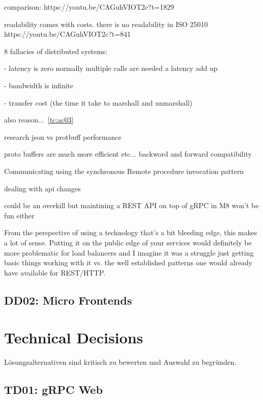 
comparison: https://youtu.be/CAGuhVIOT2c?t=1829


readability comes with costs. there is no readability in ISO 25010
https://youtu.be/CAGuhVIOT2c?t=841

8 fallacies of distributed systems:

- latency is zero
normally multiple calls are needed a latency add up

- bandwidth is infinite

- transfer cost (the time it take to marshall and unmarshall)

also reason...~\ref{tc:ac03}

research json vs protbuff performance


proto buffers are much more efficient etc...
backword and forward compatibility

Communicating using the synchronous Remote
procedure invocation pattern \citep{richardson2018microservices}

dealing with api changes





could be an overkill but maintining a REST API on top of gRPC in M8 won't be fun either

From the perspective of using a technology that's a bit bleeding edge, this makes a lot of sense. Putting it on the public edge of your services would definitely be more problematic for load balancers and I imagine it was a struggle just getting basic things working with it vs. the well established patterns one would already have available for REST/HTTP.

\subsection{DD02: Micro Frontends}

\section{Technical Decisions}

Lösungsalternativen sind kritisch zu bewerten und Auswahl zu begründen.

\subsection{TD01: gRPC Web}

